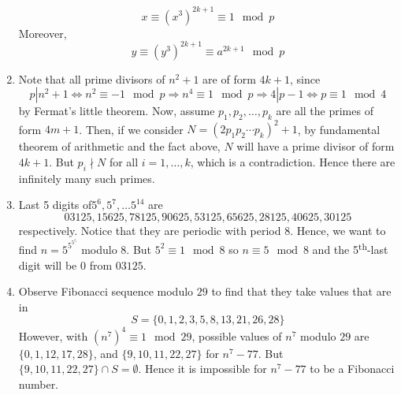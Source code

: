 \documentclass[10pt, a4paper, twoside]{report}
\begin{document}
\begin{enumerate}[{1.}]
    \[x\equiv (x^3)^{2k+1}\equiv 1\mod p\]
    Moreover,
    \[y\equiv (y^3)^{2k+1}\equiv a^{2k+1}\mod p\]
    \item Note that all prime divisors of \(n^2+1\) are of form \(4k+1\), since 
    \[p|n^2+1\Leftrightarrow n^2\equiv -1\mod p\Rightarrow n^4\equiv 1\mod p\Rightarrow 4|p-1\Leftrightarrow p\equiv 1\mod 4\]
    by Fermat's little theorem. Now, assume \(p_1,p_2,\ldots,p_k\) are all the primes of form \(4m+1\). Then, if we consider \(N=(2p_1p_2\cdots p_k)^2+1\), by fundamental theorem of arithmetic and the fact above, \(N\) will have a prime divisor of form \(4k+1\). But \(p_i\nmid N\) for all \(i=1,\ldots,k\), which is a contradiction. Hence there are infinitely many such primes. 
    \item Last 5 digits of\(5^6,5^7,\ldots 5^{14}\) are 
    \[03125,15625,78125,90625,53125,65625,28125,40625,30125\]
    respectively. Notice that they are periodic with period 8. Hence, we want to find \(n=5^{5^{5^5}}\) modulo \(8\). But \(5^2\equiv 1\mod 8\) so \(n\equiv 5\mod 8\) and the 5\textsuperscript{th}-last digit will be \(0\) from \(03125\).
    \item Observe Fibonacci sequence modulo \(29\) to find that they take values that are in 
    \[S=\{0,1,2,3,5,8,13,21,26,28\}\]
    However, with \((n^7)^4\equiv 1\mod 29\),  possible values of \(n^7\) modulo \(29\) are \\ \(\{0,1,12,17,28\}\), and \(\{9,10,11,22,27\}\) for \(n^7-77\). But \(\{9,10,11,22,27\}\cap S=\emptyset\). Hence it is impossible for \(n^7-77\) to be a Fibonacci number.
\end{enumerate}
\end{document}
